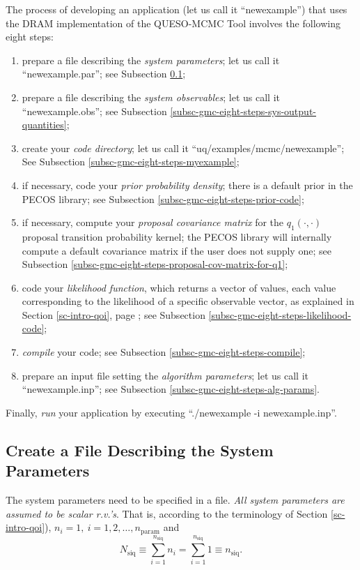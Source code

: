 The process of developing an application (let us call it ``newexample'') 
that uses the DRAM implementation of the QUESO-MCMC Tool involves the following eight steps:
\begin{enumerate}
\item prepare a file describing the {\it system parameters}; let us call it ``newexample.par''; see Subsection \ref{subsc-gmc-eight-steps-sys-input-params};
\item prepare a file describing the {\it system observables}; let us call it ``newexample.obs''; see Subsection \ref{subsc-gmc-eight-steps-sys-output-quantities};
\item create your {\it code directory}; let us call it ``uq/examples/mcmc/newexample''; See Subsection \ref{subsc-gmc-eight-steps-myexample};
\item if necessary, code your {\it prior probability density}; there is a default prior in the PECOS library; see Subsection \ref{subsc-gmc-eight-steps-prior-code};
\item if necessary, compute your {\it proposal covariance matrix} for the $q_1(\cdot,\cdot)$ proposal transition probability kernel; the PECOS library will internally compute a default covariance matrix if the user does not supply one; see Subsection \ref{subsc-gmc-eight-steps-proposal-cov-matrix-for-q1};
\item code your {\it likelihood function}, which returns a vector of values, each value corresponding to the likelihood of a specific observable vector, as explained in Section \ref{sc-intro-qoi}, page \pageref{sc-intro-qoi}; see Subsection \ref{subsc-gmc-eight-steps-likelihood-code};
\item {\it compile} your code; see Subsection \ref{subsc-gmc-eight-steps-compile};
\item prepare an input file setting the {\it algorithm parameters}; let us call it ``newexample.inp''; see Subsection \ref{subsc-gmc-eight-steps-alg-params}.
\end{enumerate}
Finally, {\it run} your application by executing ``./newexample -i newexample.inp''.

\subsection{Create a File Describing the System Parameters}\label{subsc-gmc-eight-steps-sys-input-params}

The system parameters need to be specified in a file.
{\it All system parameters are assumed to be scalar r.v.'s}. That is, according to the terminology of Section \ref{sc-intro-qoi}), $n_i=1,~i=1,2,\ldots,n_{\text{param}}$ and
\begin{equation*}
N_{\text{siq}} \equiv \sum_{i=1}^{n_{\text{siq}}}n_i = \sum_{i=1}^{n_{\text{siq}}}1 \equiv n_{\text{siq}}.
\end{equation*}


